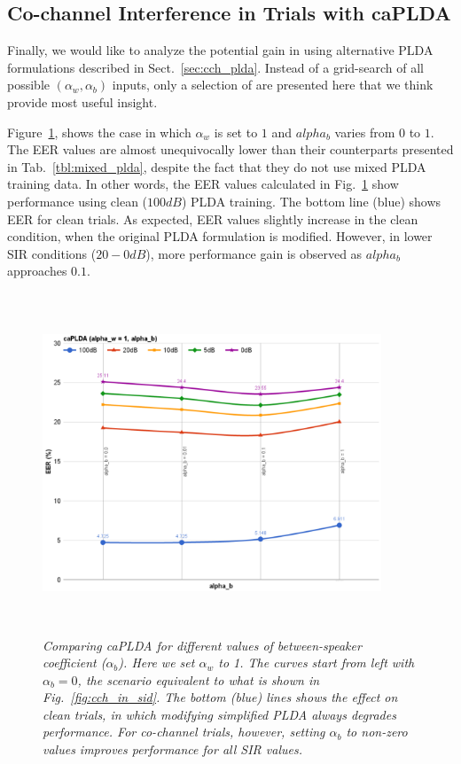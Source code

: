 \subsection{Co-channel Interference in Trials with caPLDA}
\label{ssec:caplda_exp}
Finally, we would like to analyze the potential gain in using alternative PLDA formulations described in Sect.~\ref{sec:cch_plda}. 
Instead of a grid-search of all possible $(\alpha_w,\alpha_b)$ inputs, only a selection of are presented here that we think provide most useful insight. 

Figure~\ref{fig:alpha_w_is_1}, shows the case in which $\alpha_w$ is set to $1$ and $alpha_b$ varies from $0$ to $1$. 
The EER values are almost unequivocally lower than their counterparts presented in Tab.~\ref{tbl:mixed_plda}, despite the fact that they do not use mixed PLDA training data. 
In other words, the EER values calculated in Fig.~\ref{fig:alpha_w_is_1} show performance using clean ($100dB$) PLDA training. 
The bottom line (blue) shows EER for clean trials. 
As expected, EER values slightly increase in the clean condition, when the original PLDA formulation is modified. 
However, in lower SIR conditions ($20-0dB$), more performance gain is observed as $alpha_b$ approaches $0.1$. 

\begin{figure}[h!]
	\centering
	\includegraphics[height = 4in, width=0.9\textwidth]{figures/eer_vs_alphab}
	\vspace{-2mm}
	\caption{\it \small Comparing caPLDA for different values of between-speaker coefficient ($\alpha_b$). Here we set $\alpha_w$ to 1. The curves start from left with $\alpha_b = 0$, the scenario equivalent to what is shown in Fig.~\ref{fig:cch_in_sid}. The bottom (blue) lines shows the effect on clean trials, in which modifying simplified PLDA always degrades performance. For co-channel trials, however, setting $\alpha_b$ to non-zero values improves performance for all SIR values.}
	\label{fig:alpha_w_is_1}
	\vspace{-1mm}
\end{figure}

